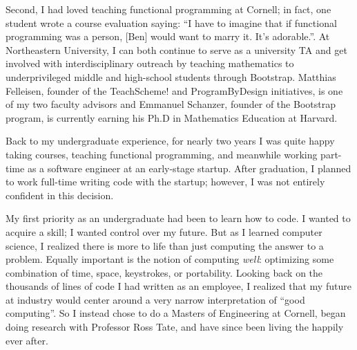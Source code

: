 \documentclass[12pt]{article}
\begin{document}

Second, I had loved teaching functional programming at Cornell; in fact, one student wrote a course evaluation saying: ``I have to imagine that if functional programming was a person, [Ben] would want to marry it. It's adorable.''.
At Northeastern University, I can both continue to serve as a university TA and get involved with interdisciplinary outreach by teaching mathematics to underprivileged middle and high-school students through Bootstrap.
Matthias Felleisen, founder of the TeachScheme! and ProgramByDesign initiatives, is one of my two faculty advisors and Emmanuel Schanzer, founder of the Bootstrap program, is currently earning his Ph.D in Mathematics Education at Harvard.


Back to my undergraduate experience, for nearly two years I was quite happy taking courses, teaching functional programming, and meanwhile working part-time as a software engineer at an early-stage startup.
After graduation, I planned to work full-time writing code with the startup; however, I was not entirely confident in this decision.

My first priority as an undergraduate had been to learn how to code.
I wanted to acquire a skill; I wanted control over my future.
But as I learned computer science, I realized there is more to life than just computing the answer to a problem.
Equally important is the notion of computing \emph{well}: optimizing some combination of time, space, keystrokes, or portability.
Looking back on the thousands of lines of code I had written as an employee, I realized that my future at industry would center around a very narrow interpretation of ``good computing''.
So I instead chose to do a Masters of Engineering at Cornell, began doing research with Professor Ross Tate, and have since been living the happily ever after.
\end{document}
